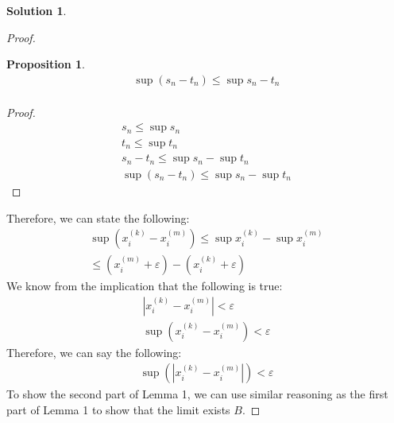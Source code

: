 \documentclass[12pt]{article}
\theoremstyle{definition} %
\newtheorem{solution}{Solution}
\newtheorem{proposition}{Proposition}
\theoremstyle{plain} %
\begin{document}
\begin{solution}
\begin{proof}
       \begin{proposition} 
        \begin{align}  
          \sup (s_{n} -t_{n} )\leq \sup s_{n} - t_{n} \\[10pt]  
        \end{align}
       \end{proposition}
        \begin{proof}
            \begin{align}
                s_{n} \leq \sup s_{n} \\[10pt] 
                t_{n} \leq \sup t_{n} \\[10pt] 
                s_{n} - t_{n} \leq \sup s_{n} -\sup t_{n} \\[10pt] 
                \sup (s_{n} -t_{n} ) \leq \sup s_{n} -\sup t_{n} 
            \end{align}
        \end{proof}
        Therefore, we can state the following:
        \begin{align}
            \sup (x_{i}^{(k)} -x_{i}^{(m)})\leq \sup x_{i}^{(k)}-\sup x_{i}^{(m)}\\[10pt] 
            \leq (x_{i}^{(m)} +\varepsilon )-(x_{i}^{(k)} +\varepsilon )
        \end{align}
        We know from the implication that the following is true:
        \begin{align} 
            \left\vert x_{i}^{(k)}- x_{i}^{(m)} \right\vert< \varepsilon \\[10pt] 
            \sup (x_{i}^{(k)}-x_{i}^{(m)}    )<\varepsilon 
        \end{align}
        Therefore, we can say the following:
        \begin{align} 
            \sup \left(  \left\vert x_{i}^{(k)}-x_{i}^{(m)} \right\vert\right)      <\varepsilon 
        \end{align}
        To show the second part of Lemma 1, we can use similar reasoning as the first part of Lemma 1 to show that the limit exists $B$.  
    \end{proof}
\end{solution}
\end{document}
